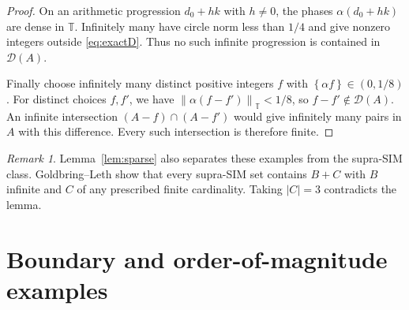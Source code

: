 \documentclass[11pt,leqno]{amsart}
\numberwithin{equation}{section}
\theoremstyle{definition}
\theoremstyle{remark}
\newtheorem{remark}[theorem]{Remark}
\newcommand{\T}{\mathbb T}
\newcommand{\D}{\mathcal D}
\newcommand{\normt}[1]{\left\|#1\right\|_{\T}}
\newcommand{\fr}[1]{\left\{#1\right\}}
\begin{document}
\begin{proof}
On an arithmetic progression $d_0+hk$ with $h\ne0$, the phases $\alpha(d_0+hk)$ are dense in $\T$. Infinitely many have circle norm less than $1/4$ and give nonzero integers outside \eqref{eq:exactD}. Thus no such infinite progression is contained in $\D(A)$.

Finally choose infinitely many distinct positive integers $f$ with $\fr{\alpha f}\in(0,1/8)$. For distinct choices $f,f'$, we have $\normt{\alpha(f-f')}<1/8$, so $f-f'\notin\D(A)$. An infinite intersection $(A-f)\cap(A-f')$ would give infinitely many pairs in $A$ with this difference. Every such intersection is therefore finite.
\end{proof}

\begin{remark}
Lemma~\ref{lem:sparse} also separates these examples from the supra-SIM class. Goldbring--Leth \cite[Corollary~4.7]{GL} show that every supra-SIM set contains $B+C$ with $B$ infinite and $C$ of any prescribed finite cardinality. Taking $|C|=3$ contradicts the lemma.
\end{remark}

\section{Boundary and order-of-magnitude examples}
\end{document}
